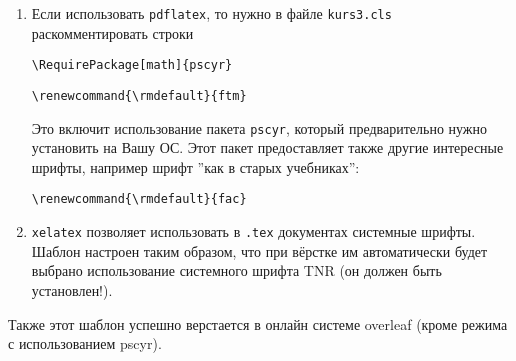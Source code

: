 \begin{enumerate}
	\item Если использовать \verb*|pdflatex|, то нужно в файле  \verb*|kurs3.cls| раскомментировать строки
	
	\verb*|\RequirePackage[math]{pscyr}|
	
	\verb*|\renewcommand{\rmdefault}{ftm}|
	
	Это включит использование пакета \verb*|pscyr|, который предварительно нужно установить на Вашу ОС. Этот пакет предоставляет также другие интересные шрифты, например шрифт ''как в старых учебниках'':
	
	 \verb*|\renewcommand{\rmdefault}{fac}|
	\item \verb*|xelatex| позволяет использовать в \verb|.tex| документах системные шрифты. Шаблон настроен таким образом, что при вёрстке им автоматически будет выбрано использование системного шрифта TNR (он должен быть установлен!).
\end{enumerate}

Также этот шаблон успешно верстается в онлайн системе overleaf (кроме режима с использованием pscyr). 

